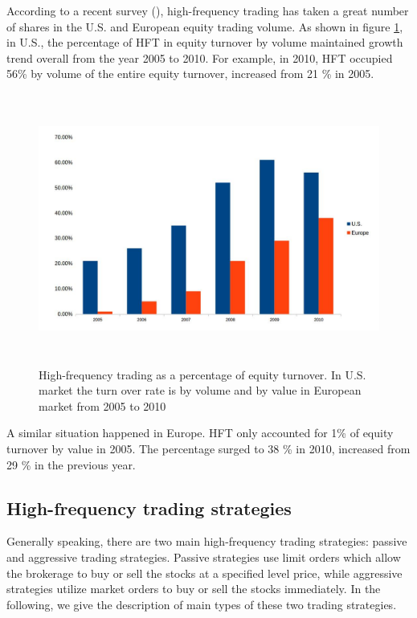 According to a recent survey  (\cite{hft_future}),  high-frequency trading has taken a great number of shares in the U.S. and European equity trading volume. As shown in figure \ref{fig.1},  in U.S.,  the percentage of HFT in equity turnover by volume maintained growth trend overall from the year 2005 to 2010. For example,  in 2010,  HFT occupied 56\% by volume of the entire equity turnover,  increased from 21 \% in 2005. 

\begin{figure}[hbtp]
  \begin{center}
    \includegraphics[width=6.5in, height=3.5in]{figures/hft_percentage.jpg}
  \end{center}
\caption{High-frequency trading as a percentage of equity turnover. In U.S. market the turn over rate is by volume and by value in European market from 2005 to 2010} \label{fig.1}
\end{figure}

A similar situation happened in Europe. HFT only accounted for 1\% of equity turnover by value in 2005. The percentage surged to 38 \% in 2010,  increased from 29 \% in the previous year.
\subsection{High-frequency trading strategies}
Generally speaking,  there are two main high-frequency trading strategies: passive and aggressive trading strategies. Passive strategies use limit orders which allow the brokerage to buy or sell the stocks at a specified level price,  while aggressive strategies utilize market orders to buy or sell the stocks immediately. In the following,  we give the description of main types of these two trading strategies. 

